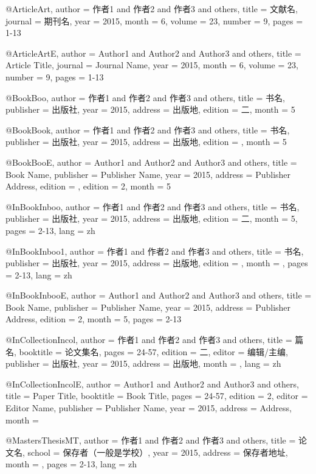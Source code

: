 @Article{Art,
author = {作者1 and 作者2 and 作者3 and others},
title = {文献名},
journal = {期刊名},
year = {2015},
month = {6},
volume = {23},
number = {9},
pages = {1-13}
}

@Article{ArtE,
author = {Author1 and Author2 and Author3 and others},
title = {Article Title},
journal = {Journal Name},
year = {2015},
month = {6},
volume = {23},
number = {9},
pages = {1-13}
}

@Book{Boo,
author = {作者1 and 作者2 and 作者3 and others},
title = {书名},
publisher = {出版社},
year = {2015},
address = {出版地},
edition = {二},
month = {5}
}

@Book{Book,
author = {作者1 and 作者2 and 作者3 and others},
title = {书名},
publisher = {出版社},
year = {2015},
address = {出版地},
edition = {},
month = {5}
}

@Book{BooE,
author = {Author1 and Author2 and Author3 and others},
title = {Book Name},
publisher = {Publisher Name},
year = {2015},
address = {Publisher Address},
edition = {},
edition = {2},
month = {5}
}

@InBook{Inboo,
author = {作者1 and 作者2 and 作者3 and others},
title = {书名},
publisher = {出版社},
year = {2015},
address = {出版地},
edition = {二},
month = {5},
pages = {2-13},
lang = {zh}
}

@InBook{Inboo1,
author = {作者1 and 作者2 and 作者3 and others},
title = {书名},
publisher = {出版社},
year = {2015},
address = {出版地},
edition = {},
month = {},
pages = {2-13},
lang = {zh}
}

@InBook{InbooE,
author = {Author1 and Author2 and Author3 and others},
title = {Book Name},
publisher = {Publisher Name},
year = {2015},
address = {Publisher Address},
edition = {2},
month = {5},
pages = {2-13}
}

@InCollection{Incol,
author = {作者1 and 作者2 and 作者3 and others},
title = {篇名},
booktitle = {论文集名},
pages = {24-57},
edition = {二},
editor = {编辑/主编},
publisher = {出版社},
year = {2015},
address = {出版地},
month = {},
lang = {zh}
}

@InCollection{IncolE,
author = {Author1 and Author2 and Author3 and others},
title = {Paper Title},
booktitle = {Book Title},
pages = {24-57},
edition = {2},
editor = {Editor Name},
publisher = {Publisher Name},
year = {2015},
address = {Address},
month = {}
}

@MastersThesis{MT,
author = {作者1 and 作者2 and 作者3 and others},
title = {论文名},
school = {保存者（一般是学校）},
year = {2015},
address = {保存者地址},
month = {},
pages = {2-13},
lang = {zh}
}

